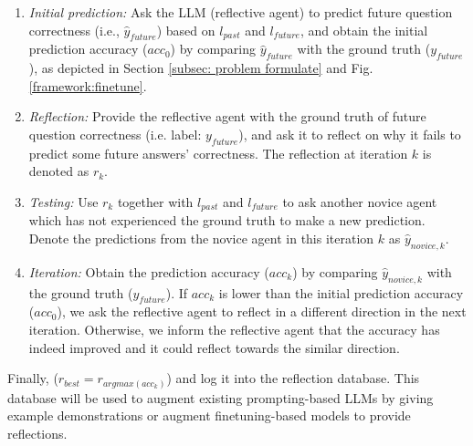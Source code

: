 \begin{enumerate}
    \item \textit{Initial prediction:} Ask the LLM (reflective agent) to predict future question correctness (i.e., $\hat{y}_{future}$) based on $l_{past}$ and $l_{future}$, and obtain the initial prediction accuracy ($acc_0$) by comparing $\hat{y}_{future}$ with the ground truth ($y_{future}$), as depicted in Section \ref{subsec: problem formulate} and Fig. \ref{framework:finetune}. 
    \item \textit{Reflection:} Provide the reflective agent with the ground truth of future question correctness (i.e. label: $y_{future}$), and ask it to reflect on why it fails to predict some future answers' correctness. The reflection at iteration $k$ is denoted as $r_k$.
    \item \textit{Testing:} Use $r_k$ together with $l_{past}$ and $l_{future}$ to ask another novice agent which has not experienced the ground truth to make a new prediction. Denote the predictions from the novice agent in this iteration $k$ as $\hat{y}_{novice,k}$.
    \item \textit{Iteration:} Obtain the prediction accuracy ($acc_k$) by comparing $\hat{y}_{novice,k}$ with the ground truth ($y_{future}$). If $acc_k$ is lower than the initial prediction accuracy ($acc_0$), we ask the reflective agent to reflect in a different direction in the next iteration. Otherwise, we inform the reflective agent that the accuracy has indeed improved and it could reflect towards the similar direction. 
\end{enumerate}

Finally,  ($r_{best}=r_{argmax(acc_k)}$) and log it into the reflection database. This database will be used to augment existing prompting-based LLMs by giving example demonstrations or augment finetuning-based models to provide reflections. 




